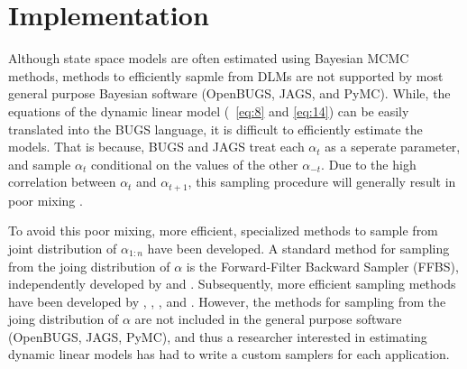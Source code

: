 \documentclass{article}
\begin{document}

%   

\section{Implementation}
\label{sec:implementation}


Although state space models are often estimated using Bayesian MCMC methods, methods to efficiently sapmle from DLMs are not supported by most general purpose Bayesian software (OpenBUGS, JAGS, and PyMC).
While, the  equations of the dynamic linear model (~\eqref{eq:8} and \eqref{eq:14}) can be easily translated into the BUGS language, it is difficult to efficiently estimate the models.
That is because, BUGS and JAGS treat each $\alpha_{t}$ as a seperate parameter, and sample $\alpha_{t}$ conditional on the values of the other $\alpha_{-t}$.
Due to the high correlation between $\alpha_{t}$ and $\alpha_{t+1}$, this sampling procedure will generally result in poor mixing \parencite[477]{Jackman2008}.

To avoid this poor mixing, more efficient, specialized methods to sample from joint distribution of $\alpha_{1:n}$ have been developed.
A standard method for sampling from the joing distribution of $\alpha$ is the Forward-Filter Backward Sampler (FFBS), independently developed by \textcite{CarterKohn1994} and \textcite{Fruehwirth-Schnatter1994}.
Subsequently, more efficient sampling methods have been developed by \textcite{DeJongShephard1995}, \textcite{DurbinKoopman2002}, \textcite{StricklandTurnerDenhamEtAl2009}, and \textcite{ChanJeliazkov2009}.
However, the methods for sampling from the joing distribution of $\alpha$ are not included in the general purpose software (OpenBUGS, JAGS, PyMC), and thus a researcher interested in estimating dynamic linear models has had to write a custom samplers for each application.
\end{document}
